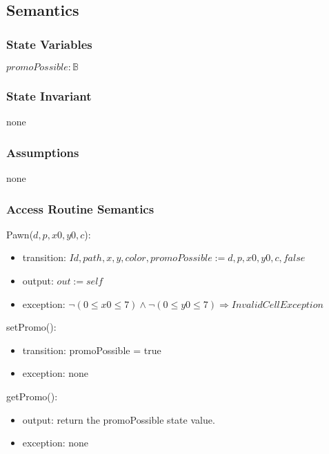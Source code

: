 \documentclass[12pt]{article}
\begin{document}
\subsection* {Semantics}

\subsubsection* {State Variables}

$promoPossible: \mathbb{B}$

\subsubsection* {State Invariant}

none

\subsubsection* {Assumptions}

none

\subsubsection* {Access Routine Semantics}

Pawn($d, p, x0, y0, c$):
\begin{itemize}
\item transition: $Id, path, x, y, color, promoPossible := d, p, x0, y0, c, false$
\item output: $out := \mathit{self}$
\item exception: $ \neg (0 \leq x0 \leq 7) \wedge  \neg (0 \leq y0 \leq 7) \Rightarrow InvalidCellException$
\end{itemize}

\noindent setPromo():
\begin{itemize}
\item transition: promoPossible = true
\item exception: none
\end{itemize}

\noindent getPromo():
\begin{itemize}
\item output: return the promoPossible state value.
\item exception: none
\end{itemize}
\end{document}
